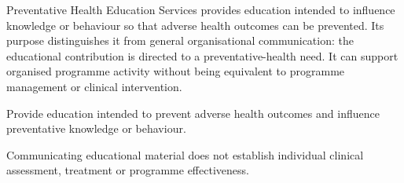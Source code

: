 Preventative Health Education Services provides education intended to influence knowledge or behaviour so that adverse health outcomes can be prevented. Its purpose distinguishes it from general organisational communication: the educational contribution is directed to a preventative-health need. It can support organised programme activity without being equivalent to programme management or clinical intervention.



Provide education intended to prevent adverse health outcomes and influence preventative knowledge or behaviour.



Communicating educational material does not establish individual clinical assessment, treatment or programme effectiveness.


